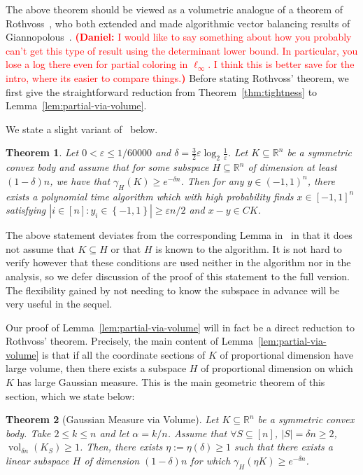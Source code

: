 \documentclass{article}
\newtheorem{theorem}{Theorem}
\newcommand{\R}{{\mathbb{R}}}
\newcommand\eps{\varepsilon}
\newcommand{\set}[1]{\left\{ #1 \right\}}
\DeclareMathOperator{\vol}{vol}
\newcommand{\notename}[2]{{\textcolor{red}{\footnotesize{\bf (#1:} {#2}{\bf ) }}}}
\newcommand{\dnote}[1]{{\notename{Daniel}{#1}}}
\newcommand{\notename}[2]{{}}
\newcommand{\dnote}[1]{}
\begin{document}
The above theorem should be viewed as a volumetric analogue of a theorem of
Rothvoss~\cite{rothvoss-giann}, who both extended and made algorithmic vector
balancing results of Giannopolous~\cite{giannop}. \dnote{I would like to say
something about how you probably can't get this type of result using the
determinant lower bound. In particular, you lose a log there even for partial
coloring in $\ell_\infty$. I think this is better save for the intro, where its
easier to compare things.} Before stating Rothvoss' theorem, we first give the
straightforward reduction from Theorem~\ref{thm:tightness} to
Lemma~\ref{lem:partial-via-volume}. 

We state a slight variant of~\cite[Lemma 9]{rothvoss-giann} below.

\begin{theorem}\label{thm:roth-giann}
Let $0 < \eps \leq 1/60000$ and $\delta = \frac{3}{2}\eps \log_2
\frac{1}{\eps}$. Let $K \subseteq \R^n$ be a symmetric convex body and assume
that for some subspace $H \subseteq \R^n$ of dimension at least $(1-\delta)n$,
we have that $\gamma_H(K) \geq e^{-\delta n}$. Then for any $y \in (-1,1)^n$,
there exists a polynomial time algorithm which with high probability finds $x
\in [-1,1]^n$ satisfying $|i \in [n]: y_i \in \set{-1,1}| \geq \eps n/2$ and
$x-y \in CK$.
\end{theorem}

The above statement deviates from the corresponding Lemma
in~\cite{rothvoss-giann} in that it does not assume that $K \subseteq H$ or that
$H$ is known to the algorithm. It is not hard to verify however that these
conditions are used neither in the algorithm nor in the analysis, so we defer
discussion of the proof of this statement to the full version. The flexibility
gained by not needing to know the subspace in advance will be very useful in the
sequel.

Our proof of Lemma~\ref{lem:partial-via-volume} will in fact be a direct
reduction to Rothvoss' theorem. Precisely, the main content of
Lemma~\ref{lem:partial-via-volume} is that if all the coordinate sections of $K$
of proportional dimension have large volume, then there exists a subspace $H$ of
proportional dimension on which $K$ has large Gaussian measure. This is the main
geometric theorem of this section, which we state below: 

\begin{theorem}[Gaussian Measure via Volume]
\label{thm:gauss-via-volume}
Let $K \subseteq \R^n$ be a symmetric convex body. Take $2 \leq k \leq n$ and
let $\alpha = k/n$. Assume that $\forall S \subseteq [n]$, $|S| = \delta n \geq
2$, $\vol_{\delta n}(K_S) \geq 1$. Then, there exists $\eta := \eta(\delta) \geq
1$ such that there exists a linear subspace $H$ of dimension $(1-\delta)n$ for
which $\gamma_H(\eta K) \geq e^{-\delta n}$.
\end{theorem}
\end{document}
